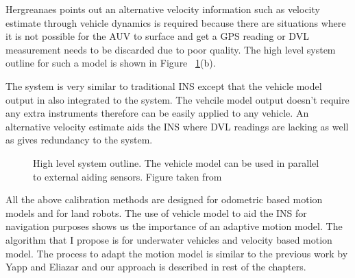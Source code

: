 \documentclass[12pt,draft]{dalcsthesis}
\begin{document}
Hergreanaes points out an alternative velocity information such as velocity estimate through vehicle dynamics is required because there are situations where it is not possible for the AUV to surface and get a GPS reading or DVL measurement needs to be discarded due to poor quality. The high level system outline for such a model is shown in Figure ~\ref{fig-INS systems}(b).

The system is very similar to traditional INS except that the vehicle model output in also integrated to the system. The vehcile model output doesn't require any extra instruments therefore can be easily applied to any vehicle. An alternative velocity estimate aids the INS where DVL readings are lacking as well as gives redundancy to the system. 




\begin{figure}
  \centering
  \qquad
 
  \caption{\label{fig-INS systems}High level system outline. The vehicle model can be used in parallel to external aiding sensors. Figure taken from \cite{Hegrenæs2008}}
\end{figure}

All the above calibration methods are designed for odometric based motion models and for land robots. The use of vehicle model to aid the INS for navigation purposes shows us the importance of an adaptive motion model. The algorithm that I propose is for underwater vehicles and velocity based motion model. The process to adapt the motion model is similar to the previous work by Yapp and Eliazar and our approach is described in rest of the chapters.
\end{document}
